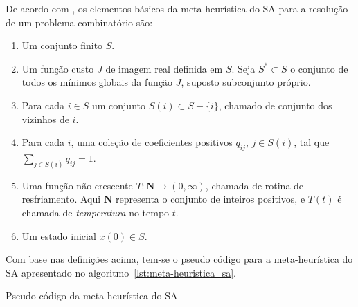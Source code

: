 De acordo com \cite{bertsimas1993simulated}, os elementos básicos da meta-heurística do SA
para a resolução de um problema combinatório são:

\begin{enumerate}
 \item Um conjunto finito $S$.
 \item Um função custo $J$ de imagem real definida em $S$. Seja $S^* \subset S$ o conjunto de todos os mínimos globais da
 função $J$, suposto subconjunto próprio.
 \item Para cada $i \in S$ um conjunto $S(i) \subset S - \{i\}$, chamado de conjunto dos vizinhos de $i$.
 \item Para cada $i$, uma coleção de coeficientes positivos $q_{ij}$, $j \in S(i)$, tal que $\sum_{j \in S(i)} q_{ij} = 1$.
 \item Uma função não crescente $T: \textbf{N} \rightarrow (0,\infty)$, chamada de rotina de resfriamento. Aqui \textbf{N}
 representa o conjunto de inteiros positivos, e $T(t)$ é chamada de \textit{temperatura} no tempo $t$.
 \item Um estado inicial $x(0) \in S$.
\end{enumerate}

Com base nas definições acima, tem-se o pseudo código para a meta-heurística do
SA apresentado no algoritmo~\ref{lst:meta-heuristica_sa}.

\begin{algorithm}


\caption{Pseudo código da meta-heurística do SA}
\label{lst:meta-heuristica_sa}
\end{algorithm}

